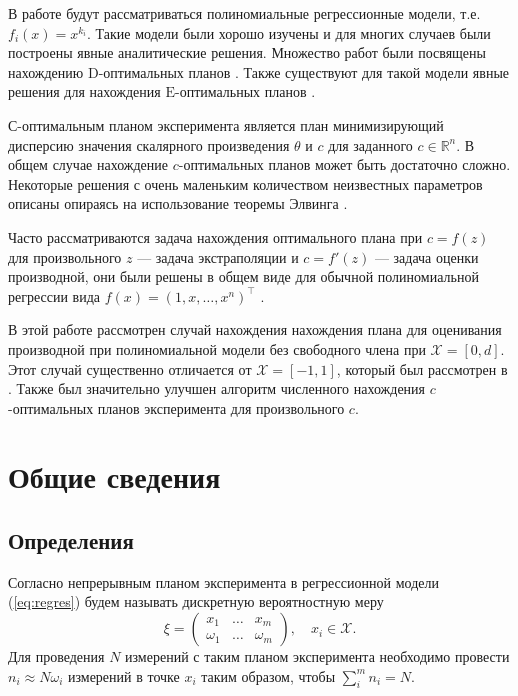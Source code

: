 \documentclass[specialist,
               substylefile = spbu.rtx,
               subf,href,colorlinks=true, 12pt]{disser}
\theoremstyle{definition}
\begin{document}
  В работе будут рассматриваться полиномиальные регрессионные модели, т.е. $f_i(x) = x^{k_i}$. Такие модели были хорошо изучены и для многих случаев были построены явные аналитические решения. Множество работ были посвящены нахождению $\mathrm{D}$-оптимальных планов \cite{hoel1958, studden1980, dette1990, dette2001}. Также существуют для такой модели явные решения для нахождения $\mathrm{E}$-оптимальных планов \cite{pukelsheim1993, dette1993, heiligers1994, dette1993_2}.
  
  С-оптимальным планом эксперимента является план минимизирующий дисперсию значения скалярного произведения $\theta$ и $c$ для заданного $c \in \mathbb{R}^n$. В общем случае нахождение $c$-оптимальных планов может быть достаточно сложно. Некоторые решения с очень маленьким количеством неизвестных параметров описаны опираясь на использование теоремы Элвинга \cite{elfving1952}. 
  
  Часто рассматриваются задача нахождения оптимального плана при $c = f(z)$ для произвольного $z$ --- задача экстраполяции и $c = f'(z)$ --- задача оценки производной, они были решены в общем виде для обычной полиномиальной регрессии вида $f(x) = (1, x, \ldots, x^n)^\top$ \cite{hoel1964, melas2010}. 
  
  В этой работе рассмотрен случай нахождения нахождения плана для оценивания производной при полиномиальной модели без свободного члена при $\mathcal{X} = [0, d]$. Этот случай существенно отличается от $\mathcal{X} = [-1, 1]$, который был рассмотрен в \cite{melasmain}. Также был значительно улучшен алгоритм численного нахождения $c$-оптимальных планов эксперимента для произвольного $c$.
  
  

\chapter{Общие сведения}

\section{Определения}

Согласно \cite{kiefer1974} непрерывным планом эксперимента в регрессионной модели (\ref{eq:regres}) будем называть дискретную вероятностную меру
  \begin{equation*}
    \xi = 
      \begin{pmatrix}
        x_1 & \ldots & x_m \\
        \omega_1 & \ldots & \omega_m
      \end{pmatrix}, \quad x_i \in \mathcal{X}.
  \end{equation*}
  Для проведения $N$ измерений с таким планом эксперимента необходимо провести $n_i \approx N \omega_i$ измерений в точке $x_i$ таким образом, чтобы $\sum^m_i n_i = N$.
\end{document}
